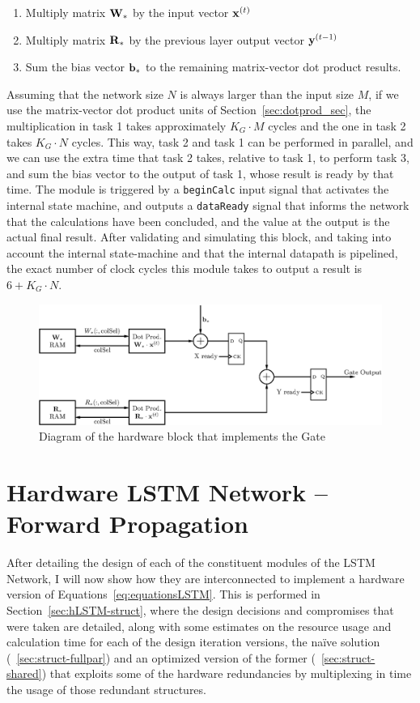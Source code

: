 \begin{enumerate}
    \item Multiply matrix $\mathbf{W}_*$ by the input vector $\mathbf{x}^{(t)}$
    \item Multiply matrix $\mathbf{R}_*$ by the previous layer output vector $\mathbf{y}^{(t-1)}$
    \item Sum the bias vector $\mathbf{b}_*$ to the remaining matrix-vector dot product results.
\end{enumerate}
Assuming that the network size $N$ is always larger than the input size $M$, if we use the matrix-vector dot product units of Section~\ref{sec:dotprod_sec}, the multiplication in task 1 takes approximately $K_G\cdot M$ cycles and the one in task 2 takes $K_G\cdot N$ cycles. This way, task 2 and task 1 can be performed in parallel, and we can use the extra time that task 2 takes, relative to task 1,  to perform task 3, and sum the bias vector to the output of task 1, whose result is ready by that time. The module is triggered by a \verb+beginCalc+ input signal that activates the internal state machine, and outputs a \verb+dataReady+ signal that informs the network that the calculations have been concluded, and the value at the output is the actual final result. 
After validating and simulating this block, and taking into account the internal state-machine and that the internal datapath is pipelined, the exact number of clock cycles this module takes to output a result is $6+K_G\cdot N$.

\begin{figure}
    \centering
    \includegraphics[width=\linewidth]{figures/gate.eps}
    \caption[Diagram of the hardware block that implements the Gate]{Diagram of the hardware block that implements the Gate}
    \label{fig:gate}
\end{figure}

\section{Hardware LSTM Network -- Forward Propagation}\label{sec:hLSTM-fp}
After detailing the design of each of the constituent modules of the LSTM Network, I will now show how they are interconnected
to implement a hardware version of Equations~\ref{eq:equationsLSTM}. This is performed in Section~\ref{sec:hLSTM-struct}, where the design decisions and compromises that were taken are detailed, along with some estimates on the resource usage and calculation time for each of the design iteration versions, the naïve solution (~\ref{sec:struct-fullpar}) and an optimized version of the former (~\ref{sec:struct-shared}) that exploits some of the hardware redundancies by multiplexing in time the usage of those redundant structures.

